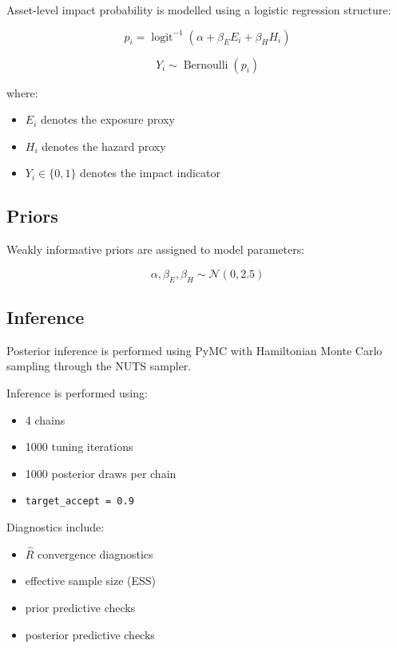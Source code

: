 \documentclass[
]{article}
\providecommand{\tightlist}{%
  \setlength{\itemsep}{0pt}\setlength{\parskip}{0pt}}
\begin{document}
Asset-level impact probability is modelled using a logistic regression
structure:

\[
p_i =
\operatorname{logit}^{-1}
\left(
\alpha + \beta_E E_i + \beta_H H_i
\right)
\]

\[
Y_i \sim \operatorname{Bernoulli}(p_i)
\]

where:

\begin{itemize}
\tightlist
\item
  \(E_i\) denotes the exposure proxy
\item
  \(H_i\) denotes the hazard proxy
\item
  \(Y_i \in \{0,1\}\) denotes the impact indicator
\end{itemize}

\subsection{Priors}\label{priors}

Weakly informative priors are assigned to model parameters:

\[
\alpha, \beta_E, \beta_H \sim \mathcal{N}(0, 2.5)
\]

\subsection{Inference}\label{inference}

Posterior inference is performed using PyMC with Hamiltonian Monte Carlo
sampling through the NUTS sampler.

Inference is performed using:

\begin{itemize}
\tightlist
\item
  4 chains
\item
  1000 tuning iterations
\item
  1000 posterior draws per chain
\item
  \texttt{target\_accept\ =\ 0.9}
\end{itemize}

Diagnostics include:

\begin{itemize}
\tightlist
\item
  \(\hat{R}\) convergence diagnostics
\item
  effective sample size (ESS)
\item
  prior predictive checks
\item
  posterior predictive checks
\end{itemize}
\end{document}
